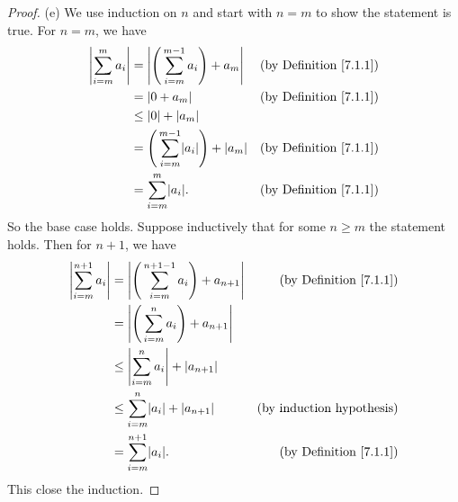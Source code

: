 \begin{proof}{(e)}
We use induction on \(n\) and start with \(n = m\) to show the statement is true.
For \(n = m\), we have
\begin{align*}
\abs*{\sum_{i = m}^m a_i} &= \abs*{\Bigg(\sum_{i = m}^{m - 1} a_i\Bigg) + a_m} & \text{(by Definition \ref{7.1.1})} \\
&= \abs*{0 + a_m} & \text{(by Definition \ref{7.1.1})} \\
&\leq \abs*{0} + \abs*{a_m} \\
&= \Bigg(\sum_{i = m}^{m - 1} \abs*{a_i}\Bigg) + \abs*{a_m} & \text{(by Definition \ref{7.1.1})} \\
&= \sum_{i = m}^m \abs*{a_i}. & \text{(by Definition \ref{7.1.1})}
\end{align*}
So the base case holds.
Suppose inductively that for some \(n \geq m\) the statement holds.
Then for \(n + 1\), we have
\begin{align*}
\abs*{\sum_{i = m}^{n + 1} a_i} &= \abs*{\Bigg(\sum_{i = m}^{n + 1 - 1} a_i\Bigg) + a_{n + 1}} & \text{(by Definition \ref{7.1.1})} \\
&= \abs*{\Bigg(\sum_{i = m}^n a_i\Bigg) + a_{n + 1}} \\
&\leq \abs*{\sum_{i = m}^n a_i} + \abs*{a_{n + 1}} \\
&\leq \sum_{i = m}^n \abs*{a_i} + \abs*{a_{n + 1}} & \text{(by induction hypothesis)} \\
&= \sum_{i = m}^{n + 1} \abs*{a_i}. & \text{(by Definition \ref{7.1.1})}
\end{align*}
This close the induction.
\end{proof}


